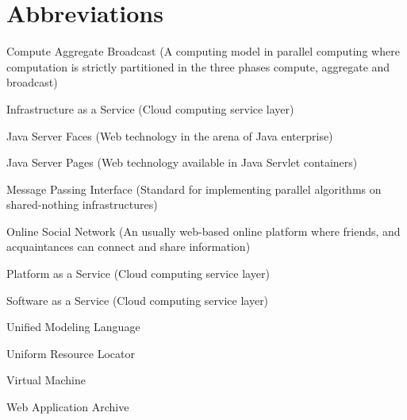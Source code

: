 \chapter*{Abbreviations}

\begin{description}
\setlength{\itemsep}{-11pt}
\setlength{\leftmargin}{900pt}

\item[CAB] Compute Aggregate Broadcast (A computing model in parallel computing where computation is strictly partitioned in the three phases compute, aggregate and broadcast)

\item[IaaS] Infrastructure as a Service (Cloud computing service layer)

\item[JSF] Java Server Faces (Web technology in the arena of Java enterprise)
\item[JSP] Java Server Pages (Web technology available in Java Servlet containers)

\item[MPI] Message Passing Interface (Standard for implementing parallel algorithms on shared-nothing infrastructures)

\item[OSN] Online Social Network (An usually web-based online platform where friends, and acquaintances can connect and share information)

\item[PaaS] Platform as a Service (Cloud computing service layer)

\item[SaaS] Software as a Service (Cloud computing service layer)

\item[UML] Unified Modeling Language
\item[URL] Uniform Resource Locator

\item[VM] Virtual Machine

\item[WAR] Web Application Archive

\end{description}
